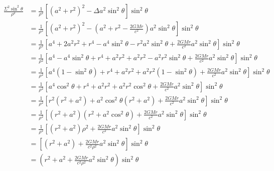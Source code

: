 \begin{equation}
    \begin{aligned}
        \frac{\Sigma^2 \sin ^2 \theta}{\rho^2} & =\frac{1}{\rho^2}\left[\left(a^2+r^2\right)^2-\Delta a^2 \sin ^2 \theta\right] \sin ^2 \theta                                                                         \\
                                               & =\frac{1}{\rho^2}\left[\left(a^2+r^2\right)^2-\left(a^2+r^2-\frac{2 G M r}{c^2}\right) a^2 \sin ^2 \theta\right] \sin ^2 \theta                                       \\
                                               & =\frac{1}{\rho^2}\left[a^4+2 a^2 r^2+r^4-a^4 \sin ^2 \theta-r^2 a^2 \sin ^2 \theta+\frac{2 G M r}{c^2} a^2 \sin ^2 \theta\right] \sin ^2 \theta                       \\
                                               & =\frac{1}{\rho^2}\left[a^4-a^4 \sin ^2 \theta+r^4+a^2 r^2+a^2 r^2-a^2 r^2 \sin ^2 \theta+\frac{2 G M r}{c^2} a^2 \sin ^2 \theta\right] \sin ^2 \theta                 \\
                                               & =\frac{1}{\rho^2}\left[a^4\left(1-\sin ^2 \theta\right)+r^4+a^2 r^2+a^2 r^2\left(1-\sin ^2 \theta\right)+\frac{2 G M r}{c^2} a^2 \sin ^2 \theta\right] \sin ^2 \theta \\
                                               & =\frac{1}{\rho^2}\left[a^4 \cos ^2 \theta+r^4+a^2 r^2+a^2 r^2 \cos ^2 \theta+\frac{2 G M r}{c^2} a^2 \sin ^2 \theta\right] \sin ^2 \theta                             \\
                                               & =\frac{1}{\rho^2}\left[r^2\left(r^2+a^2\right)+a^2 \cos ^2 \theta\left(r^2+a^2\right)+\frac{2 G M r}{c^2} a^2 \sin ^2 \theta\right] \sin ^2 \theta                    \\
                                               & =\frac{1}{\rho^2}\left[\left(r^2+a^2\right)\left(r^2+a^2 \cos ^2 \theta\right)+\frac{2 G M r}{c^2} a^2 \sin ^2 \theta\right] \sin ^2 \theta                           \\
                                               & =\frac{1}{\rho^2}\left[\left(r^2+a^2\right) \rho^2+\frac{2 G M r}{c^2} a^2 \sin ^2 \theta\right] \sin ^2 \theta                                                       \\
                                               & =\left[\left(r^2+a^2\right)+\frac{2 G M r}{c^2 \rho^2} a^2 \sin ^2 \theta\right] \sin ^2 \theta                                                                       \\
                                               & =\left(r^2+a^2+\frac{2 G M r}{c^2 \rho^2} a^2 \sin ^2 \theta\right) \sin ^2 \theta
    \end{aligned}
\end{equation}

